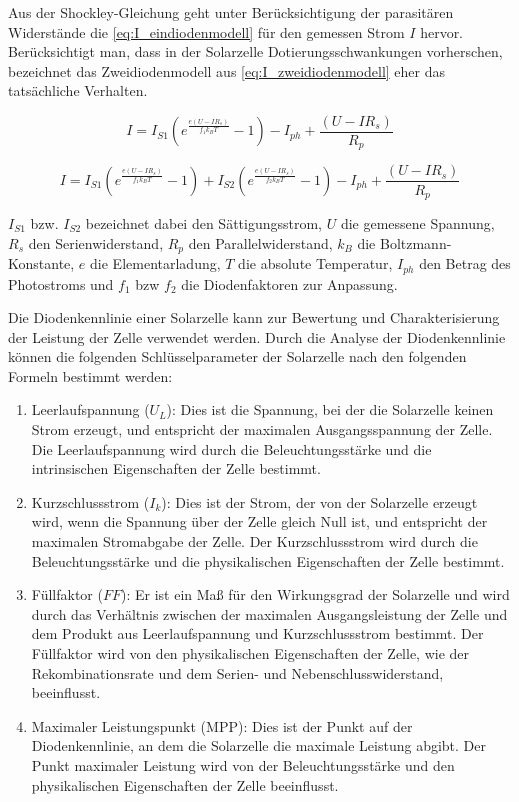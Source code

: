 \documentclass[12pt,english,ngerman]{scrartcl}
\begin{document}
Aus der Shockley-Gleichung geht unter Berücksichtigung der parasitären
Widerstände die \autoref{eq:I_eindiodenmodell} für den gemessen Strom $I$
hervor. Berücksichtigt man, dass in der Solarzelle Dotierungsschwankungen
vorherschen, bezeichnet das Zweidiodenmodell aus
\autoref{eq:I_zweidiodenmodell} eher das tatsächliche Verhalten.

\begin{equation}
	I=I_{S 1}\left(e^{\frac{e\left(U-I R_s\right)}{f_1 k_B T}}-1\right)-I_{p h}+\frac{\left(U-I R_s\right)}{R_p}
	\label{eq:I_eindiodenmodell}
\end{equation}

\begin{equation}
	I=I_{S 1}\left(e^{\frac{e\left(U-I R_s\right)}{f_1 k_B T}}-1\right)+I_{S 2}\left(e^{\frac{e\left(U-I R_s\right)}{f_2 k_B T}}-1\right)-I_{p h}+\frac{\left(U-I R_s\right)}{R_p}
	\label{eq:I_zweidiodenmodell}
\end{equation}

$I_{S 1}$ bzw. $I_{S 2}$ bezeichnet dabei den Sättigungsstrom,
$U$ die gemessene Spannung,
$R_{s}$ den Serienwiderstand,
$R_p$ den Parallelwiderstand,
$k_B$ die Boltzmann-Konstante,
$e$ die Elementarladung,
$T$ die absolute Temperatur,
$I_{ph}$ den Betrag des Photostroms und
$f_1$ bzw $f_2$ die Diodenfaktoren zur Anpassung.

Die Diodenkennlinie einer Solarzelle kann zur Bewertung und Charakterisierung
der Leistung der Zelle verwendet werden. Durch die Analyse der Diodenkennlinie
können die folgenden Schlüsselparameter der Solarzelle nach den folgenden
Formeln bestimmt werden:

\begin{enumerate}
	\item Leerlaufspannung ($U_L$): Dies ist die Spannung, bei der die Solarzelle keinen
	      Strom erzeugt, und entspricht der maximalen Ausgangsspannung der Zelle. Die
	      Leerlaufspannung wird durch die Beleuchtungsstärke und die intrinsischen
	      Eigenschaften der Zelle bestimmt.
	\item Kurzschlussstrom ($I_k$): Dies ist der Strom, der von der Solarzelle erzeugt
	      wird, wenn die Spannung über der Zelle gleich Null ist, und entspricht der
	      maximalen Stromabgabe der Zelle. Der Kurzschlussstrom wird durch die
	      Beleuchtungsstärke und die physikalischen Eigenschaften der Zelle bestimmt.
	\item Füllfaktor ($FF$): Er ist ein Maß für den Wirkungsgrad der Solarzelle und wird
	      durch das Verhältnis zwischen der maximalen Ausgangsleistung der Zelle und dem
	      Produkt aus Leerlaufspannung und Kurzschlussstrom bestimmt. Der Füllfaktor wird
	      von den physikalischen Eigenschaften der Zelle, wie der Rekombinationsrate und
	      dem Serien- und Nebenschlusswiderstand, beeinflusst.
	\item Maximaler Leistungspunkt (MPP): Dies ist der Punkt auf der Diodenkennlinie, an
	      dem die Solarzelle die maximale Leistung abgibt. Der Punkt maximaler Leistung
	      wird von der Beleuchtungsstärke und den physikalischen Eigenschaften der Zelle
	      beeinflusst.
\end{enumerate}
\end{document}
